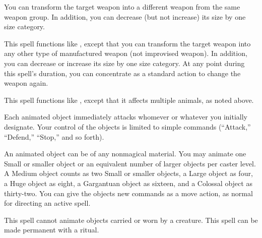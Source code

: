\spelldur{\durmed}
\begin{spelleffect}
    You can transform the target weapon into a different weapon from the same weapon group. In addition, you can decrease (but not increase) its size by one size category.
\end{spelleffect}

\begin{spelleffect}
    This spell functions like , except that you can transform the target weapon into any other type of manufactured weapon (not improvised weapon). In addition, you can decrease or increase its size by one size category. At any point during this spell's duration, you can concentrate as a standard action to change the weapon again.
\end{spelleffect}

\spellrng{\rngmed}
\begin{spelleffect}
  This spell functions like , except that it affects multiple animals, as noted above.
\end{spelleffect}

\spellrng{\rngmed}
\spelldur{\durshort}
\begin{spelleffect}
  Each animated object immediately attacks whomever or whatever you initially designate. Your control of the objects is limited to simple commands (``Attack,'' ``Defend,'' ``Stop,'' and so forth).
  \par An animated object can be of any nonmagical material. You may animate one Small or smaller object or an equivalent number of larger objects per caster level. A Medium object counts as two Small or smaller objects, a Large object as four, a Huge object as eight, a Gargantuan object as sixteen, and a Colossal object as thirty-two. You can give the objects new commands as a move action, as normal for directing an active spell.
\end{spelleffect}
\begin{spellnotes}
  This spell cannot animate objects carried or worn by a creature. This spell can be made permanent with a  ritual.
\end{spellnotes}

